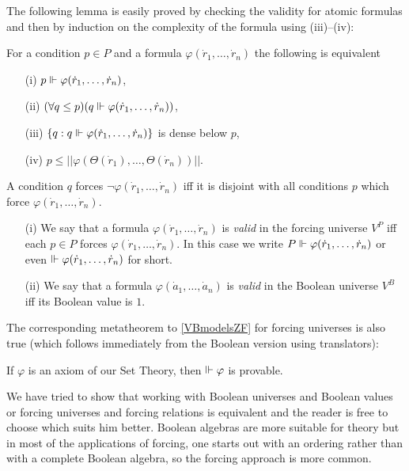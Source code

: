 The following lemma is easily proved by checking the validity for atomic formulas and then by induction on the complexity of the formula using (iii)--(iv):
\begin{lemma} For a condition $p\in P$ and a formula $\varphi(\dot{r}_1,\ldots,\dot{r}_n)$ the following is equivalent
\begin{itemize}
 \item[(i)]   $p\Vdash\varphi(\dot{r}_1,\ldots,\dot{r}_n)$,
 \item[(ii)]  $(\forall q\leq p)(q\Vdash\varphi(\dot{r}_1,\ldots,\dot{r}_n))$,
 \item[(iii)] $\{q:q\Vdash\varphi(\dot{r}_1,\ldots,\dot{r}_n)\}$ is dense below $p$,
 \item[(iv)]  $p\leq||\varphi(\Theta(\dot{r}_1),\ldots,\Theta(\dot{r}_n))||$.
\end{itemize}
\end{lemma}
\begin{corollary} A condition $q$ forces $\neg\varphi(\dot{r}_1,\ldots,\dot{r}_n)$ iff it is disjoint with all conditions $p$ which force $\varphi(\dot{r}_1,\ldots,\dot{r}_n)$.
\end{corollary}

\begin{definition}[Validity]
 \begin{itemize}
  \item[]
  \item[(i)] We say that a formula $\varphi(\dot{r}_1,\ldots,\dot{r}_n)$ is \emph{valid} in the forcing universe $V^P$ iff each $p\in P$ forces
  $\varphi(\dot{r}_1,\ldots,\dot{r}_n)$. In this case we write $P\Vdash\varphi(\dot{r}_1,\ldots,\dot{r}_n)$ or even $\Vdash\varphi(\dot{r}_1,\ldots,\dot{r}_n)$ for short.
  \item[(ii)] We say that a formula $\varphi(\dot{a}_1,\ldots,\dot{a}_n)$ is \emph{valid} in the Boolean universe $V^B$ iff its Boolean value is $1$.
 \end{itemize}
\end{definition}

The corresponding metatheorem to \ref{VBmodelsZF} for forcing universes is also true (which
follows immediately from the Boolean version using translators):

\begin{metatheorem} If $\varphi$ is an axiom of our Set Theory, then $\Vdash\varphi$ is provable.
\end{metatheorem}

We have tried to show that working with Boolean universes and Boolean values or forcing universes
and forcing relations is equivalent and the reader is free to choose which suits him better. Boolean
algebras are more suitable for theory but in most of the applications of forcing, one starts out
with an ordering rather than with a complete Boolean algebra, so the forcing approach is more common.

